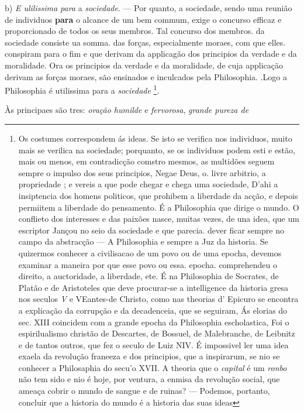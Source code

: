 b) \emph{E ulilissima para} a \emph{sociedade}. --- Por quanto, a sociedade, sendo uma reunião de individuos \textbf{para} o alcance de um bem commum, exige o concurso efficaz e proporcionado de todos os seus membros. Tal concurso dos membros. da sociedade consiste ua somma. das forças, especialmente moraes, com que elles. conspiram para o fim e que derivam da applicagão dos principios da verdade e da moralidade. Ora os principios da verdade e da moralidade, de cuja applicação derivam as forças moraes, são ensinados e inculcados pela Philosophia. .Logo a Philosophia é utilissima para a \emph{sociedade} \footnote{Os costumes correspondem ás ideas. Se isto se verifica nos individuos, muito mais se verilica na sociedade; porquanto, se os individuos podem esti e estão, mais ou menos, em contradicção comstro mesmos, as multidões seguem sempre o impulso dos seus principios, Negae Deus, o. livre arbitrio, a propriedade ; e vereis a que pode chegar e chega uma sociedade, D'ahi a insiptencia dos homens politicos, que prohibem a liberdade da acção, e depois permiitem a liberdade do pensamento. É a Philosophia que dirige o mundo. O conflieto dos interesses e das paixões nasce, muitas vezes, de una idea, que um escriptor Jançou no seio da sociedade e que parecia. dever ficar sempre no campo da abstracção --- A Philosophia e sempre a Juz da historia. Se quizermos conhecer a civilisacao de um povo ou de uma epocha, devemos examinar a maneira por que esse povo ou essa. epocha. comprehendeu o direito, a auctoridade, a liberdade, ete. É na Philosophia de Socrates, de Platão e de Aristoteles que deve procurar-se a intelligence da historia gresa nos seculos \emph{V} e VEantes-de Christo, como nas theorias d' Epicuro se encontra a explicação da corrupção e da decadenceia, que se seguiram, Ás elorias do sec. XIII coincidem com a grande epocha da Philosophia escholastica, Foi o espirilualismo christão de Descartes, de Bossuel, de Malebranche, de Leibnitz e de tantos outros, que fez o seculo de Luiz NIV. É impossivel ler uma idea exaela da revolução franeeza e dos principios, que a inspirarum, se nio se conhecer a Philosaphia do secu'o XVII. A theoria que o \emph{capital} é um \emph{ronbo} não tem sido e nio é hoje, por ventura, a enmisa da revolução social, que ameaça cobrir o mundo de sangue e de ruinas? --- Podemos, portanto, concluir que a historia do mundo é a historia das suas ideas}.


 
Às principaes são tres: \emph{oração humilde} e \emph{fervorosa}, \emph{grande pureza de}

